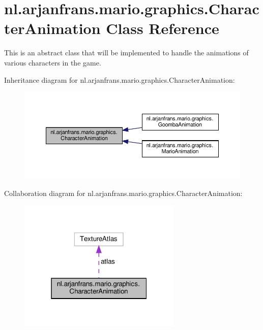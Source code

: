 \hypertarget{classnl_1_1arjanfrans_1_1mario_1_1graphics_1_1CharacterAnimation}{}\section{nl.\+arjanfrans.\+mario.\+graphics.\+Character\+Animation Class Reference}
\label{classnl_1_1arjanfrans_1_1mario_1_1graphics_1_1CharacterAnimation}


This is an abstract class that will be implemented to handle the animations of various characters in the game.  




Inheritance diagram for nl.\+arjanfrans.\+mario.\+graphics.\+Character\+Animation\+:
\nopagebreak
\begin{figure}[H]
\begin{center}
\leavevmode
\includegraphics[width=350pt]{classnl_1_1arjanfrans_1_1mario_1_1graphics_1_1CharacterAnimation__inherit__graph}
\end{center}
\end{figure}


Collaboration diagram for nl.\+arjanfrans.\+mario.\+graphics.\+Character\+Animation\+:\nopagebreak
\begin{figure}[H]
\begin{center}
\leavevmode
\includegraphics[width=220pt]{classnl_1_1arjanfrans_1_1mario_1_1graphics_1_1CharacterAnimation__coll__graph}
\end{center}
\end{figure}
